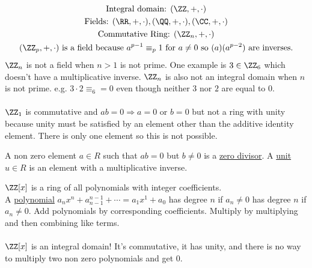 \documentclass[class=scrartcl, crop=false]{standalone}
\begin{document}
\begin{example}
  \begin{gather*}
    \text{Integral domain: } (\ZZ, +, \cdot) \\
    \text{Fields: }(\RR, +, \cdot), 
    (\QQ, +, \cdot), 
    (\CC, +, \cdot) \\
    \text{Commutative Ring: } (\ZZ_n, +, \cdot) \\
    (\ZZ_p, +, \cdot) \ \text{is a field because } a^{p - 1} \equiv_p 1 \ \text{for} \ a \neq 0 \ \text{so} \ (a)(a^{p - 2}) \ \text{are inverses.} \\
  \end{gather*}
  $\ZZ_n$ is not a field when $n > 1$ is not prime. One example is $3 \in \ZZ_6$ which doesn't have a multiplicative inverse. $\ZZ_n$ is also not an integral domain when $n$ is not prime. e.g. $3 \cdot 2 \equiv_6 = 0$ even though neither $3$ nor $2$ are equal to 0.
  \\\\
  $\ZZ_1$ is commutative and $ab = 0 \Rightarrow a = 0$ or $b = 0$ but not a ring with unity because unity must be satisfied by an element other than the additive identity element. There is only one element so this is not possible. 
\end{example}

\begin{definition}
  A non zero element $a \in R$ such that $ab = 0$ but $b \neq 0$ is a \ul{zero divisor}. A \ul{unit} $u \in R$ is an element with a multiplicative inverse.
\end{definition}

\begin{definition}
  $\ZZ[x]$ is a ring of all polynomials with integer coefficients.
  \\
  A \ul{polynomial} $a_nx^n + a_{n - 1}^{n - 1} + \cdots = a_1x^1 + a_0$ has degree $n$ if $a_n \neq 0$ has degree $n$ if  $a_n \neq 0$. Add polynomials by corresponding coefficients. Multiply by multiplying and then combining like terms.
  \\\\
  $\ZZ[x]$ is an integral domain! It's commutative, it has unity, and there is no way to multiply two non zero polynomials and get 0.
\end{definition}
\end{document}

